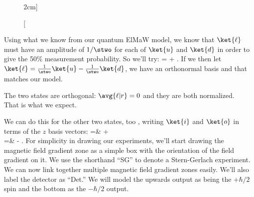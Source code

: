 \begin{example}
\begin{figure}
\caption[][2cm]{ }
\label{fig:spinexample13}
\end{figure}

\sol Using what we know from our quantum ElMaW model, we know that $\ket{\ell}$ must have an amplitude of $1/\stwo$ for each of $\ket{u}$ and $\ket{d}$ in order to give the 50\% measurement probability. So we'll try:
\beq
{} =   +  .
\eeq
If we then let $\ket{\ell} = \frac{1}{\stwo} \ket{u} - \frac{1}{\stwo} \ket{d}$, we have an orthonormal basis and that matches our model.


\assess The two states are orthogonal: $\avg{\ell|r}=0$ and they are both normalized. That is what we expect.

\end{example}

\begin{marginfigure}\centering
{}
\end{marginfigure}
We can do this for the other two states, too , writing $\ket{i}$ and $\ket{o}$ in terms of the $z$ basis vectors:
\bas
{} =&  + \frac{\I}{\stwo}\\
 =&  - \frac{\I}{\stwo}.
\eas
For simplicity in drawing our experiments, we'll start drawing the magnetic field gradient zone as a simple box with the orientation of the field gradient on it. We use the shorthand ``SG'' to denote a Stern-Gerlach experiment. We can now link together multiple magnetic field gradient zones easily. We'll also label the detector as ``Det.'' We will model the upwards output as being the $+\hbar/2$ spin and the bottom as the $-\hbar/2$ output.

